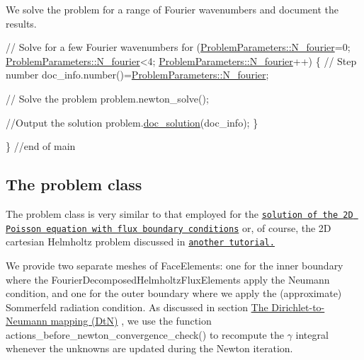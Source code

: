 We solve the problem for a range of Fourier wavenumbers and document the results.


\begin{DoxyCodeInclude}
 
 \textcolor{comment}{// Solve for a few Fourier wavenumbers}
 \textcolor{keywordflow}{for} (\hyperlink{namespaceProblemParameters_aaa674958a1ca6ee0b99de3377288c93f}{ProblemParameters::N\_fourier}=0;
      \hyperlink{namespaceProblemParameters_aaa674958a1ca6ee0b99de3377288c93f}{ProblemParameters::N\_fourier}<4;
      \hyperlink{namespaceProblemParameters_aaa674958a1ca6ee0b99de3377288c93f}{ProblemParameters::N\_fourier}++)
  \{
   \textcolor{comment}{// Step number}
   doc\_info.number()=\hyperlink{namespaceProblemParameters_aaa674958a1ca6ee0b99de3377288c93f}{ProblemParameters::N\_fourier};
   
   \textcolor{comment}{// Solve the problem}
   problem.newton\_solve();
   
   \textcolor{comment}{//Output the solution}
   problem.\hyperlink{classFourierDecomposedHelmholtzProblem_a893efb01f8f1d254315201121766d882}{doc\_solution}(doc\_info);
  \}
 
\} \textcolor{comment}{//end of main}

\end{DoxyCodeInclude}




 

\hypertarget{index_class}{}\subsection{The problem class}\label{index_class}
The problem class is very similar to that employed for the \href{../../../poisson/two_d_poisson_flux_bc_adapt/html/index.html}{\tt solution of the 2D Poisson equation with flux boundary conditions} or, of course, the 2D cartesian Helmholtz problem discussed in \href{../../../helmholtz/scattering/html/index.html}{\tt another tutorial.}

We provide two separate meshes of {\ttfamily Face\+Elements\+:} one for the inner boundary where the {\ttfamily Fourier\+Decomposed\+Helmholtz\+Flux\+Elements} apply the Neumann condition, and one for the outer boundary where we apply the (approximate) Sommerfeld radiation condition. As discussed in section \hyperlink{index_DtN}{The Dirichlet-\/to-\/\+Neumann mapping (DtN)} , we use the function {\ttfamily actions\+\_\+before\+\_\+newton\+\_\+convergence\+\_\+check()} to recompute the $ \gamma $ integral whenever the unknowns are updated during the Newton iteration.

